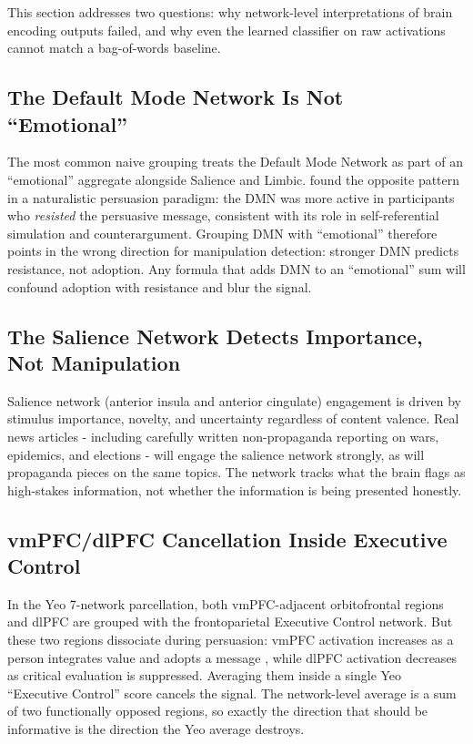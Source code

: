 \documentclass[11pt]{article}
\begin{document}
This section addresses two questions: why network-level interpretations of brain encoding outputs failed, and why even the learned classifier on raw activations cannot match a bag-of-words baseline.

\subsection{The Default Mode Network Is Not ``Emotional''}

The most common naive grouping treats the Default Mode Network as part of an ``emotional'' aggregate alongside Salience and Limbic. \citet{ntoumanis2024deciphering} found the opposite pattern in a naturalistic persuasion paradigm: the DMN was more active in participants who \emph{resisted} the persuasive message, consistent with its role in self-referential simulation and counterargument. Grouping DMN with ``emotional'' therefore points in the wrong direction for manipulation detection: stronger DMN predicts resistance, not adoption. Any formula that adds DMN to an ``emotional'' sum will confound adoption with resistance and blur the signal.

\subsection{The Salience Network Detects Importance, Not Manipulation}

Salience network (anterior insula and anterior cingulate) engagement is driven by stimulus importance, novelty, and uncertainty regardless of content valence. Real news articles - including carefully written non-propaganda reporting on wars, epidemics, and elections - will engage the salience network strongly, as will propaganda pieces on the same topics. The network tracks what the brain flags as high-stakes information, not whether the information is being presented honestly.

\subsection{vmPFC/dlPFC Cancellation Inside Executive Control}

In the Yeo 7-network parcellation, both vmPFC-adjacent orbitofrontal regions and dlPFC are grouped with the frontoparietal Executive Control network. But these two regions dissociate during persuasion: vmPFC activation increases as a person integrates value and adopts a message \cite{falk2010predicting}, while dlPFC activation decreases as critical evaluation is suppressed. Averaging them inside a single Yeo ``Executive Control'' score cancels the signal. The network-level average is a sum of two functionally opposed regions, so exactly the direction that should be informative is the direction the Yeo average destroys.
\end{document}
